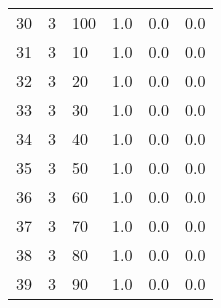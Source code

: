 \documentclass{article}
\begin{document}
{\begin{tabular}{llllll}
30 &         3 &        100 &              1.0 &                       0.0 &                                   0.0 \\
31 &         3 &         10 &              1.0 &                       0.0 &                                   0.0 \\
32 &         3 &         20 &              1.0 &                       0.0 &                                   0.0 \\
33 &         3 &         30 &              1.0 &                       0.0 &                                   0.0 \\
34 &         3 &         40 &              1.0 &                       0.0 &                                   0.0 \\
35 &         3 &         50 &              1.0 &                       0.0 &                                   0.0 \\
36 &         3 &         60 &              1.0 &                       0.0 &                                   0.0 \\
37 &         3 &         70 &              1.0 &                       0.0 &                                   0.0 \\
38 &         3 &         80 &              1.0 &                       0.0 &                                   0.0 \\
39 &         3 &         90 &              1.0 &                       0.0 &                                   0.0 \\
\bottomrule
\end{tabular}
}
\newpage
\end{document}
